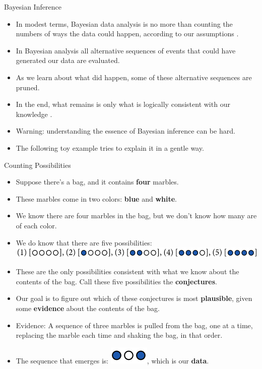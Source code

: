 \documentclass[handout]{beamer}
\begin{document}
\begin{frame}{Bayesian Inference}
\scriptsize{
\begin{itemize}
 \item In modest terms, Bayesian data analysis is no more than counting the numbers of ways
the data could happen, according to our assumptions \cite{mcelreath2020statistical}.
 \item In Bayesian analysis all alternative sequences of events that could have generated our data are evaluated.
 \item As we learn about what did happen, some of these alternative sequences are pruned. 
 \item In the end, what remains is only what is logically consistent with our knowledge \cite{mcelreath2020statistical}.
 \item Warning: understanding the essence of Bayesian inference can be hard.
 \item The following toy example tries to explain it in a gentle way.
\end{itemize}
 } 
\end{frame}


\begin{frame}{Counting Possibilities}
\scriptsize{
\begin{itemize}
 \item Suppose there's a bag, and it contains \textbf{four} marbles.
 \item These marbles come in two colors: \textbf{blue} and \textbf{white}. 
 \item We know there are four marbles in the bag, but we don't know how many are of each color. 
 \item We do know that there are five possibilities: \includegraphics[scale=0.3]{pics/marbles1.png}
 \item These are the only possibilities consistent with what we know about the contents of the bag. Call these five possibilities the \textbf{conjectures}.
 \item Our goal is to figure out which of these conjectures is most \textbf{plausible}, given some \textbf{evidence} about the contents of the bag. 
 \item Evidence: A sequence of three marbles is pulled from the bag, one at a time, replacing the marble each time and shaking the bag, in that order. 
 \item The sequence that emerges is: \includegraphics[scale=0.5]{pics/marbles2.png}, which is our \textbf{data}. 
  
\end{itemize}
 } 
\end{frame}
\end{document}
